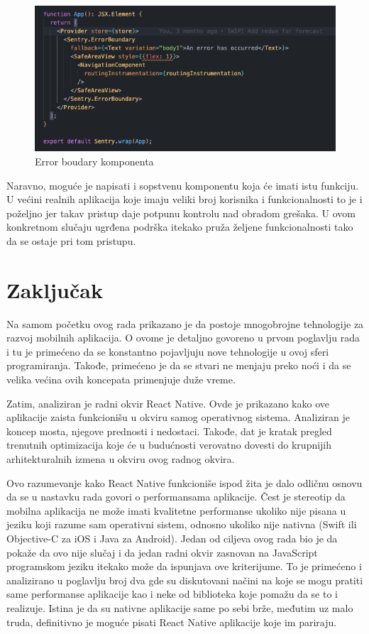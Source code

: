 \documentclass[12pt,oneside]{memoir}
\begin{document}
\begin{figure}[h!]
\centering
\includegraphics[scale=0.5]{docs/images/chapterSeven/ErrorBoundary.png}
\caption{Error boudary komponenta}
\label{fig:errorBoundary}
\end{figure}

Naravno, moguće je napisati i sopstvenu komponentu koja će imati istu funkciju. U većini realnih aplikacija koje imaju veliki broj korisnika i funkcionalnosti to je i poželjno jer takav pristup daje potpunu kontrolu nad obradom grešaka. U ovom konkretnom slučaju ugrđena podrška itekako pruža željene funkcionalnosti tako da 
se ostaje pri tom pristupu.

\chapter{Zaključak}

Na samom početku ovog rada prikazano je da postoje mnogobrojne tehnologije za razvoj mobilnih aplikacija. O ovome je detaljno govoreno u prvom poglavlju rada i tu je primećeno da se konstantno pojavljuju nove tehnologije u ovoj sferi programiranja. Takođe, primećeno je da se stvari ne menjaju preko noći i da se velika većina ovih koncepata primenjuje duže vreme.

Zatim, analiziran je radni okvir React Native. Ovde je prikazano kako ove aplikacije zaista funkcionišu u okviru samog operativnog sistema. Analiziran je koncep mosta, njegove prednosti i nedostaci. Takođe, dat je kratak pregled trenutnih optimizacija koje će u budućnosti verovatno dovesti do krupnijih arhitekturalnih izmena u okviru ovog radnog okvira. 

Ovo razumevanje kako React Native funkcioniše ispod žita je dalo odličnu osnovu da se u nastavku rada govori o performansama aplikacije. Čest je stereotip da mobilna aplikacija ne može imati kvalitetne performanse ukoliko nije pisana u jeziku koji razume sam operativni sistem, odnosno ukoliko nije nativna (Swift ili Objective-C za iOS i Java za Android). Jedan od ciljeva ovog rada bio je da pokaže da ovo nije slučaj i da jedan radni okvir zasnovan na JavaScript programskom jeziku itekako može da ispunjava ove kriterijume. To je primećeno i analizirano u poglavlju broj dva gde su diskutovani načini na koje se mogu pratiti same performanse aplikacije kao i neke od biblioteka koje pomažu da se to i realizuje. Istina je da su nativne aplikacije same po sebi brže, međutim uz malo truda, definitivno je moguće pisati React Native aplikacije koje im pariraju.
\end{document}
